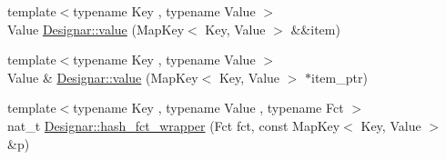 \begin{DoxyCompactItemize}
\item 
{\footnotesize template$<$typename Key , typename Value $>$ }\\Value \hyperlink{namespace_designar_a54c38cc2398cdee4d9641ed50f43110b}{Designar\+::value} (Map\+Key$<$ Key, Value $>$ \&\&item)
\item 
{\footnotesize template$<$typename Key , typename Value $>$ }\\Value \& \hyperlink{namespace_designar_a93bd8a834a0093067e2da608fc18e4e4}{Designar\+::value} (Map\+Key$<$ Key, Value $>$ $\ast$item\+\_\+ptr)
\item 
{\footnotesize template$<$typename Key , typename Value , typename Fct $>$ }\\nat\+\_\+t \hyperlink{namespace_designar_a696580cb9bbe71161e0e3ffa27c95157}{Designar\+::hash\+\_\+fct\+\_\+wrapper} (Fct fct, const Map\+Key$<$ Key, Value $>$ \&p)
\end{DoxyCompactItemize}
